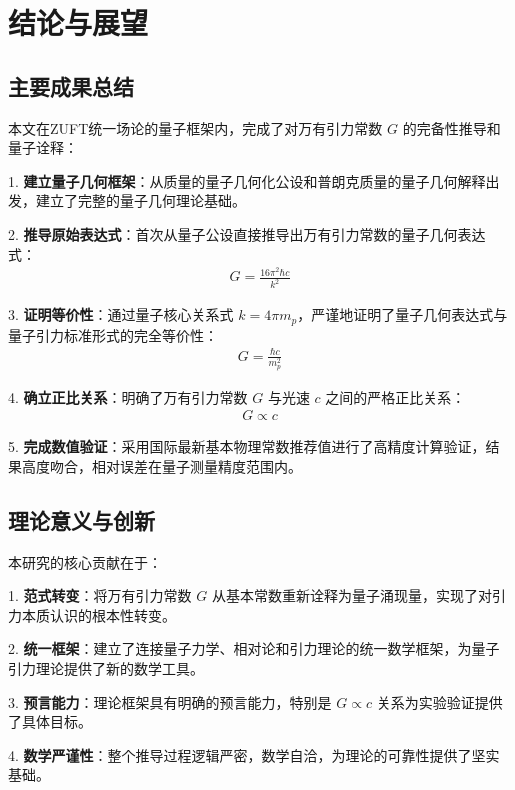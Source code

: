 \documentclass[12pt,twocolumn]{article}
\begin{document}
\section{结论与展望}

\subsection{主要成果总结}

本文在ZUFT统一场论的量子框架内，完成了对万有引力常数 $G$ 的完备性推导和量子诠释：

1. \textbf{建立量子几何框架}：从质量的量子几何化公设和普朗克质量的量子几何解释出发，建立了完整的量子几何理论基础。
    
2. \textbf{推导原始表达式}：首次从量子公设直接推导出万有引力常数的量子几何表达式： 
    \begin{align}
        G = \frac{16\pi^2 \hbar c}{k^2}
    \end{align}
    
3. \textbf{证明等价性}：通过量子核心关系式 $k = 4\pi m_p$，严谨地证明了量子几何表达式与量子引力标准形式的完全等价性： 
    \begin{align}
        G = \frac{\hbar c}{m_p^2}
    \end{align}
    
4. \textbf{确立正比关系}：明确了万有引力常数 $G$ 与光速 $c$ 之间的严格正比关系： 
    \begin{align}
        G \propto c
    \end{align}
    
5. \textbf{完成数值验证}：采用国际最新基本物理常数推荐值进行了高精度计算验证，结果高度吻合，相对误差在量子测量精度范围内。

\subsection{理论意义与创新}

本研究的核心贡献在于：

1. \textbf{范式转变}：将万有引力常数 $G$ 从基本常数重新诠释为量子涌现量，实现了对引力本质认识的根本性转变。
    
2. \textbf{统一框架}：建立了连接量子力学、相对论和引力理论的统一数学框架，为量子引力理论提供了新的数学工具。
    
3. \textbf{预言能力}：理论框架具有明确的预言能力，特别是 $G \propto c$ 关系为实验验证提供了具体目标。
    
4. \textbf{数学严谨性}：整个推导过程逻辑严密，数学自洽，为理论的可靠性提供了坚实基础。
\end{document}
